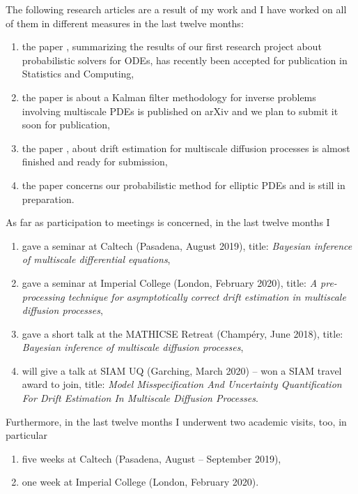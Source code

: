 \documentclass{article}
\theoremstyle{theorem}
\theoremstyle{definition}
\begin{document}
The following research articles are a result of my work and I have worked on all of them in different measures in the last twelve months:
\begin{enumerate}
	\item the paper \cite{AbG20}, summarizing the results of our first research project about probabilistic solvers for ODEs, has recently been accepted for publication in Statistics and Computing,
	\item the paper \cite{AGZ19} is about a Kalman filter methodology for inverse problems involving multiscale PDEs is published on arXiv and we plan to submit it soon for publication,
	\item the paper \cite{AGP20}, about drift estimation for multiscale diffusion processes is almost finished and ready for submission,
	\item the paper \cite{AbG20b} concerns our probabilistic method for elliptic PDEs and is still in preparation.
\end{enumerate}
As far as participation to meetings is concerned, in the last twelve months I
\begin{enumerate}
	\item gave a seminar at Caltech (Pasadena, August 2019), title: \textit{Bayesian inference of multiscale differential equations},
	\item gave a seminar at Imperial College (London, February 2020), title: \textit{A pre-processing technique for asymptotically correct drift estimation in multiscale diffusion processes},	
	\item gave a short talk at the MATHICSE Retreat (Champéry, June 2018), title: \textit{Bayesian inference of multiscale diffusion processes},
	\item will give a talk at SIAM UQ (Garching, March 2020) -- won a SIAM travel award to join, title: \textit{Model Misspecification And Uncertainty Quantification For Drift Estimation In Multiscale Diffusion Processes}.
\end{enumerate}	
Furthermore, in the last twelve months I underwent two academic visits, too, in particular
\begin{enumerate}
	\item five weeks at Caltech (Pasadena, August -- September 2019),
	\item one week at Imperial College (London, February 2020).
\end{enumerate}



\end{document}
